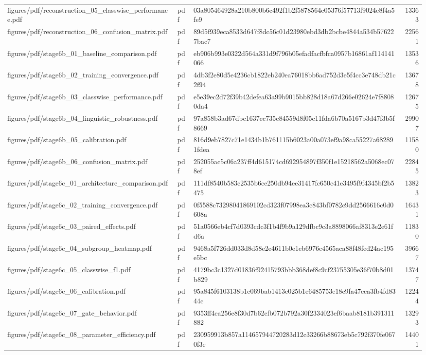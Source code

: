\begin{tabular}{lllr}
figures/pdf/reconstruction_05_classwise_performance.pdf & pdf & 03a805464928a210b800b6c492f1b2f5878564c05376f57713f9024e8f4a5fe9 & 13363 \\
figures/pdf/reconstruction_06_confusion_matrix.pdf & pdf & 89d5f939eca8533d647f8dc56c01d23980ebd3db2bcbe4844a534b576227bac7 & 22561 \\
figures/pdf/stage6b_01_baseline_comparison.pdf & pdf & eb906b993e0322d564a331d9f796b05efadfacfbfca0957b16861af114141066 & 13536 \\
figures/pdf/stage6b_02_training_convergence.pdf & pdf & 4db3f2e80d5e4236cb1822eb240ea76018bb6ad752d3e5f4cc3e748db21c2f94 & 13678 \\
figures/pdf/stage6b_03_classwise_performance.pdf & pdf & e5e39ec2d72f39b42defea63a99b9015bb828d18a67d266e02624e7f88080da4 & 12675 \\
figures/pdf/stage6b_04_linguistic_robustness.pdf & pdf & 97a858b3ad67dbc1637ec735c84559d8f05c11fda6b70a5167b3d47f3b5f8669 & 29907 \\
figures/pdf/stage6b_05_calibration.pdf & pdf & 816d9eb7827c71e1434b1b761115b6023a00a073ef9a98ca55227a682891fdea & 11580 \\
figures/pdf/stage6b_06_confusion_matrix.pdf & pdf & 252055ac5c06a237ff4d615174cd692954897f350f1e15218562a5068ec078ef & 22845 \\
figures/pdf/stage6c_01_architecture_comparison.pdf & pdf & 111df8540b583c2535b6ce250db94ee31417fc650c41e3495f9f4345bf2b5475 & 13823 \\
figures/pdf/stage6c_02_training_convergence.pdf & pdf & 0f5588c73298041869102cd323f07998ea3c843bf0782c9dd2566616c0d0608a & 16431 \\
figures/pdf/stage6c_03_paired_effects.pdf & pdf & 51a0566eb4cf7d0393cdc3f1b4f9b9a129dfbc9c3a8898066af8313e2e61fd6a & 11830 \\
figures/pdf/stage6c_04_subgroup_heatmap.pdf & pdf & 9468a5f726dd033d8d58e2e4611b0e1eb6976c4565aca88f48fed24ac195e5bc & 39667 \\
figures/pdf/stage6c_05_classwise_f1.pdf & pdf & 4179bc3c1327d01836f92415793bbb368def8c9cf23755305e36f70b8d01b829 & 13747 \\
figures/pdf/stage6c_06_calibration.pdf & pdf & 95a845f6103138b1e069bab1413e025b1e6485753e18c9fa47eca3fb4fd8344c & 12244 \\
figures/pdf/stage6c_07_gate_behavior.pdf & pdf & 9353ff4ea256e8f30d7b62cfb072b792a30f2334023ef6baab8181b391311882 & 13293 \\
figures/pdf/stage6c_08_parameter_efficiency.pdf & pdf & 230959913b857a114657944720283d12c33266b88673eb5c792f370fe0670f3e & 14401 \\

\end{tabular}
